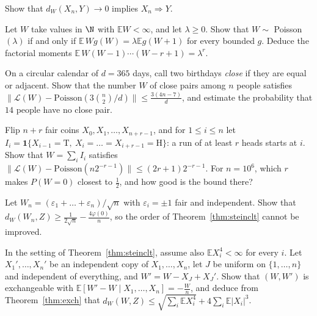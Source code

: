 \begin{exercise}[$\star$]\label{ex:dwlaw}
Show that $d_W(X_n,Y)\to0$ implies $X_n\Rightarrow Y$.
\end{exercise}

\begin{exercise}[$\star$]\label{ex:poissonchar}
Let $W$ take values in $\N$ with $\mathbb EW<\infty$, and let $\lambda\ge0$. Show that $W\sim$ Poisson$(\lambda)$ if and only if $\mathbb E\,Wg(W)=\lambda\mathbb Eg(W+1)$ for every bounded $g$. Deduce the
factorial moments $\mathbb E\,W(W-1)\cdots(W-r+1)=\lambda^r$.
\end{exercise}

\begin{exercise}[$\star$]\label{ex:nearbirthday}
On a circular calendar of $d=365$ days, call two birthdays \emph{close} if they are equal or adjacent. Show that the number $W$ of close pairs among $n$ people
satisfies $\|\mathcal L(W)-\text{Poisson}(3\binom n2/d)\|\le\frac{3(4n-7)}d$, and estimate the probability that $14$ people have no close pair.
\end{exercise}

\begin{exercise}[$\star\star$]\label{ex:headruns}
Flip $n+r$ fair coins $X_0,X_1,\dots,X_{n+r-1}$, and for $1\le i\le n$ let $I_i=\mathbf 1\{X_{i-1}=\mathrm T,\ X_i=\dots=X_{i+r-1}=\mathrm H\}$: a run of at least $r$ heads starts at $i$.
Show that $W=\sum_iI_i$ satisfies $\|\mathcal L(W)-\text{Poisson}(n2^{-r-1})\|\le(2r+1)2^{-r-1}$. For $n=10^6$, which $r$ makes $P(W=0)$ closest to $\frac12$, and how good is the bound there?
\end{exercise}

\begin{exercise}[$\star\star$]\label{ex:latticedw}
Let $W_n=(\varepsilon_1+\dots+\varepsilon_n)/\sqrt n$ with $\varepsilon_i=\pm1$ fair and independent. Show that $d_W(W_n,Z)\ge\frac1{2\sqrt n}-\frac{4\varphi(0)}n$, so the order of
Theorem~\ref{thm:steinclt} cannot be improved.
\end{exercise}

\begin{exercise}[$\star\star$]\label{ex:exchclt}
In the setting of Theorem~\ref{thm:steinclt}, assume also $\mathbb E X_i^4<\infty$ for every $i$. Let $X_1',\dots,X_n'$ be an independent copy of $X_1,\dots,X_n$, let $J$ be uniform on $\{1,\dots,n\}$ and independent of
everything, and $W'=W-X_J+X_J'$. Show that $(W,W')$ is exchangeable with $\mathbb E[W'-W\mid X_1,\dots,X_n]=-\frac Wn$, and deduce from Theorem~\ref{thm:exch} that
$d_W(W,Z)\le\sqrt{\sum_i\mathbb EX_i^4}+4\sum_i\mathbb E|X_i|^3$.
\end{exercise}


